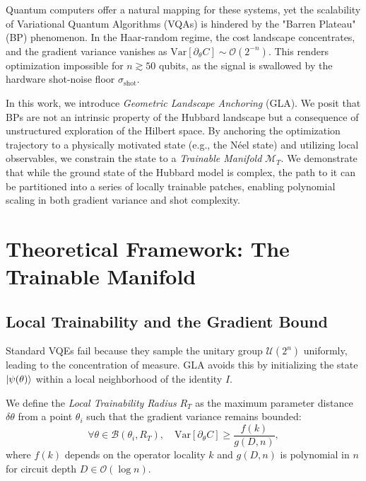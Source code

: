 \documentclass[aps,prx,reprint,superscriptaddress,amsmath,amssymb]{revtex4-2}
\newcommand{\Var}{\mathrm{Var}}
\newcommand{\McalT}{\mathcal{M}_T}
\begin{document}
Quantum computers offer a natural mapping for these systems, yet the scalability of Variational Quantum Algorithms (VQAs) is hindered by the "Barren Plateau" (BP) phenomenon. In the Haar-random regime, the cost landscape concentrates, and the gradient variance vanishes as $\Var[\partial_\theta C] \sim \mathcal{O}(2^{-n})$. This renders optimization impossible for $n \gtrsim 50$ qubits, as the signal is swallowed by the hardware shot-noise floor $\sigma_{\text{shot}}$.

In this work, we introduce \textit{Geometric Landscape Anchoring} (GLA). We posit that BPs are not an intrinsic property of the Hubbard landscape but a consequence of unstructured exploration of the Hilbert space. By anchoring the optimization trajectory to a physically motivated state (e.g., the Néel state) and utilizing local observables, we constrain the state to a \textit{Trainable Manifold} $\McalT$. We demonstrate that while the ground state of the Hubbard model is complex, the path to it can be partitioned into a series of locally trainable patches, enabling polynomial scaling in both gradient variance and shot complexity.

\section{Theoretical Framework: The Trainable Manifold}
\subsection{Local Trainability and the Gradient Bound}
Standard VQEs fail because they sample the unitary group $\mathcal{U}(2^n)$ uniformly, leading to the concentration of measure. GLA avoids this by initializing the state $\ket{\psi(\theta)}$ within a local neighborhood of the identity $I$.

We define the \textit{Local Trainability Radius} $R_T$ as the maximum parameter distance $\delta \theta$ from a point $\theta_i$ such that the gradient variance remains bounded:
\begin{equation}
\forall \theta \in \mathcal{B}(\theta_i, R_T), \quad \Var[\partial_\theta C] \ge \frac{f(k)}{g(D,n)},
\end{equation}
where $f(k)$ depends on the operator locality $k$ and $g(D,n)$ is polynomial in $n$ for circuit depth $D \in \mathcal{O}(\log n)$.
\end{document}
